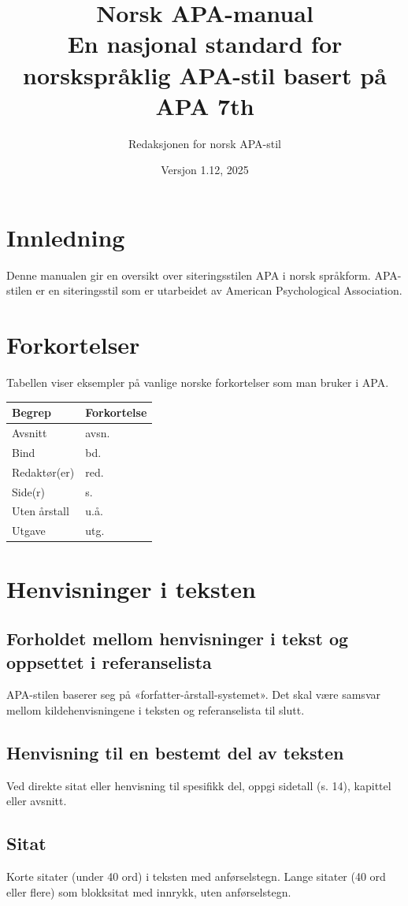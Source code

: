 \documentclass[a4paper,12pt]{report}
\title{Norsk APA-manual\\ \large En nasjonal standard for norskspråklig APA-stil basert på APA 7th}
\author{Redaksjonen for norsk APA-stil}
\date{Versjon 1.12, 2025}
\begin{document}
\maketitle

\tableofcontents

\chapter{Innledning}
Denne manualen gir en oversikt over siteringsstilen APA i norsk språkform. APA-stilen er en siteringsstil som er utarbeidet av American Psychological Association.

\chapter{Forkortelser}
Tabellen viser eksempler på vanlige norske forkortelser som man bruker i APA.

\begin{tabular}{|l|l|}
\hline
\textbf{Begrep} & \textbf{Forkortelse} \\ \hline
Avsnitt & avsn. \\ \hline
Bind & bd. \\ \hline
Redaktør(er) & red. \\ \hline
Side(r) & s. \\ \hline
Uten årstall & u.å. \\ \hline
Utgave & utg. \\ \hline
\end{tabular}

\chapter{Henvisninger i teksten}
\section{Forholdet mellom henvisninger i tekst og oppsettet i referanselista}
APA-stilen baserer seg på «forfatter-årstall-systemet». Det skal være samsvar mellom kildehenvisningene i teksten og referanselista til slutt.

\section{Henvisning til en bestemt del av teksten}
Ved direkte sitat eller henvisning til spesifikk del, oppgi sidetall (s. 14), kapittel eller avsnitt.

\section{Sitat}
Korte sitater (under 40 ord) i teksten med anførselstegn.
Lange sitater (40 ord eller flere) som blokksitat med innrykk, uten anførselstegn.
\end{document}

